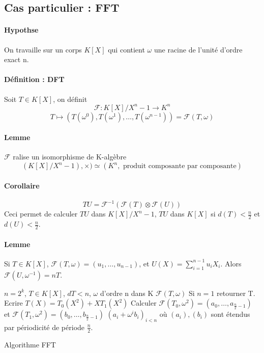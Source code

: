 \documentclass[12pt,a4paper]{report}
\begin{document}
\subsection*{Cas particulier : FFT}
\paragraph{Hypothse\\}
On travaille sur un corps $K[X]$ qui contient $\omega$ une racine de l'unité d'ordre exact n.
\paragraph{Définition : DFT\\}
Soit $ T\in K[X]$, on définit
$$ \mathcal{F} : K[X]/X^n-1 \longrightarrow  K^n $$
$$T \longmapsto (T(\omega^0),T(\omega^1),\ldots,T(\omega^{n-1})) = \mathcal{F}(T,\omega)$$
\paragraph{Lemme\\}
$\mathcal{F}$ ralise un isomorphisme de K-algèbre $$ (K[X]/X^n-1), \times) \simeq (K^n,\mbox{ produit composante par composante})$$
\paragraph{Corollaire\\}
$$TU = \mathcal{F}^{-1}(\mathcal{F}(T) \otimes \mathcal{F}(U))$$
Ceci permet de calculer $TU$ dans $K[X]/X^n-1$, $TU$ dans $ K[X]$ si $d(T) < \frac{n}{2}$ et $d(U) < \frac{n}{2}$.
\paragraph{Lemme\\}
Si $ T \in K[X]$, $\mathcal{F}(T,\omega)=(u_1,\ldots,u_{n-1})$, et $\displaystyle U(X) = \sum_{i=1}^{n-1} u_i X_i$. Alors $\mathcal{F}(U,\omega^{-1})=nT$.
\begin{algorithm}[h!]
\begin{algorithmic}
\REQUIRE $n=2^k$, $T \in K[X]$, $dT<n$, $\omega$ d'ordre n dans K
\ENSURE $\mathcal{F}(T,\omega)$
\STATE Si $n=1$ retourner T.
\STATE Ecrire $T(X) = T_0(X^2)+ X T_1(X^2)$
\STATE Calculer $\mathcal{F}(T_0,\omega^2)=(a_0,\ldots,a_{\frac{n}{2}-1})$ et $ \mathcal{F}(T_1,\omega^2)=(b_0,\ldots,b_{\frac{n}{2}-1})$
\RETURN $(a_i+\omega ^i b_i)_{i<n}$ où $ (a_i),(b_i)$ sont étendus par périodicité de période $ \frac{n}{2}$.
\end{algorithmic}
\caption{Algorithme FFT}
\end{algorithm}
\end{document}
